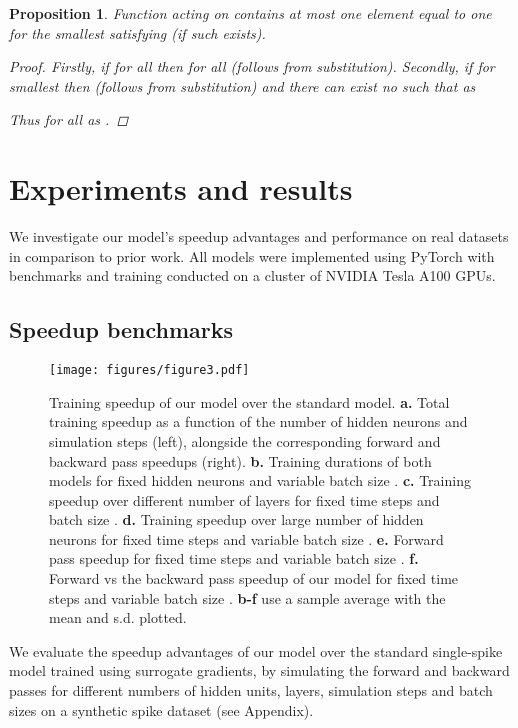 \documentclass{article} \usepackage{iclr2023_conference,times}
\newtheorem{proposition}[theorem]{Proposition}
\begin{document}
\begin{proposition}
\label{prop1}
Function  acting on  contains at most one element equal to one  for the smallest  satisfying  (if such  exists).
\begin{proof}
Firstly, if  for all  then  for all  (follows from substitution). Secondly, if  for smallest  then  (follows from substitution) and there can exist no  such that  as

Thus  for all  as .
\end{proof}
\end{proposition}

\section{Experiments and results}

We investigate our model's speedup advantages and performance on real datasets in comparison to prior work. All models were implemented using PyTorch \citep{paszke2017automatic} with benchmarks and training conducted on a cluster of NVIDIA Tesla A100 GPUs.

\subsection{Speedup benchmarks}
\label{sec:speedup}

\begin{figure}[h!]
    \texttt{[image: figures/figure3.pdf]}
	\centering
	\caption{Training speedup of our model over the standard model. \textbf{a.} Total training speedup as a function of the number of hidden neurons  and simulation steps  (left), alongside the corresponding forward and backward pass speedups (right). \textbf{b.} Training durations of both models for fixed hidden neurons  and variable batch size . \textbf{c.} Training speedup over different number of layers for fixed time steps  and batch size . \textbf{d.} Training speedup over large number of hidden neurons  for fixed time steps  and variable batch size . \textbf{e.} Forward pass speedup for fixed time steps  and variable batch size . \textbf{f.} Forward vs the backward pass speedup of our model for fixed time steps  and variable batch size . \textbf{b-f} use a  sample average with the mean and s.d. plotted.}
	\label{fig:speedup}
\end{figure}

We evaluate the speedup advantages of our model over the standard single-spike model trained using surrogate gradients, by simulating the forward and backward passes for different numbers of hidden units, layers, simulation steps and batch sizes on a synthetic spike dataset (see Appendix).
\end{document}
